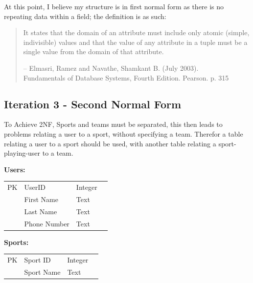 \documentclass[10pt]{article}
\begin{document}
                At this point, I believe my structure is in first normal form as there is no repeating data within a field; the definition is as such:
                \begin{quotation}
                    It states that the domain of an attribute must include only atomic (simple, indivisible) values and that the value of any attribute in a tuple must be a single value from the domain of that attribute.
                    \begin{flushright}
                        -- Elmasri, Ramez and Navathe, Shamkant B. (July 2003).\\
                        Fundamentals of Database Systems, Fourth Edition. Pearson. p. 315
                    \end{flushright}
                \end{quotation}


            \subsection{Iteration 3 - Second Normal Form}

                To Achieve 2NF, Sports and teams must be separated, this then leads to problems relating a user to a sport, without specifying a team. Therefor a table relating a user to a sport should be used, with another table relating a sport-playing-user to a team.

                \begin{center}
                    \textbf{Users:}\\
                    \begin{tabular}{ | r | l | l | p{10cm} } 
                        \cline{1-3}
                        PK & UserID & Integer & \\ \cline{1-3}
                        & First Name & Text & \\ \cline{1-3}
                        & Last Name & Text & \\ \cline{1-3}
                        & Phone Number & Text & \\ \cline{1-3}
                    \end{tabular}
                \end{center}

                \begin{center}
                    \textbf{Sports:}\\
                    \begin{tabular}{ | r | l | l | p{10cm} } 
                        \cline{1-3}
                        PK & Sport ID & Integer & \\ \cline{1-3}
                        & Sport Name & Text & \\ \cline{1-3}
                    \end{tabular}
                \end{center}
\end{document}
